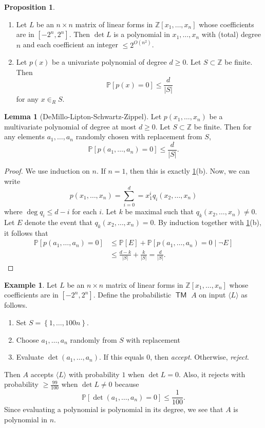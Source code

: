 \documentclass[10pt,letterpaper,cm]{nupset}
\theoremstyle{definition}
\newtheorem{exmp}[definition]{Example}
\theoremstyle{theorem}
\newtheorem{lemma}[definition]{Lemma}
\newtheorem{prop}[definition]{Proposition}
\theoremstyle{remark}
\newcommand{\Z}{\mathbb Z}
\newcommand{\1}{\mathbf{1}}
\newcommand{\0}{\vec 0}
\DeclareMathOperator{\TM}{\mathsf{TM}}
\begin{document}
\begin{prop}\label{poly} $ $
\begin{enumerate}[label=(\alph*)]
\item Let $L$ be an $n\times n$ matrix of linear forms in $\Z[x_1, \ldots, x_n]$ whose coefficients are in $\left[{-2}^n, 2^n\right]$. Then $\det{L}$ is a polynomial in $x_1, \ldots, x_n$ with (total) degree $n$ and each coefficient an integer $\leq 2^{O(n^2)}$.
\item Let $p(x)$ be a univariate polynomial of degree $d \geq 0$. Let $S\subset \Z$ be finite. Then $$\mathbb{P}\left[p(x) =0\right] \leq \frac{d}{\left\lvert{S}\right\rvert}$$ for any $x\in_R S$.
\end{enumerate}
\end{prop}

\begin{lemma}[DeMillo-Lipton-Schwartz-Zippel]\label{Dem}
Let $p(x_1, \ldots, x_n)$ be a multivariate polynomial of degree at most $d\geq 0$. Let $S \subset \Z$ be finite. Then for any elements $a_1, \ldots, a_n$ randomly chosen with replacement from $S$, $$\mathbb{P}\left[p(a_1, \ldots, a_n) =0\right] \leq \frac{d}{\left\lvert{S}\right\rvert}.$$
\end{lemma}
\begin{proof}
We use induction on $n$. If $n=1$, then this is exactly \cref{poly}(b). Now, we can write $$p(x_1, \ldots, x_n) = \sum_{i=0}^d = x_1^i q_i(x_2, \ldots, x_n)$$ where $\deg{q_i} \leq d-i$ for each $i$. Let $k$ be maximal such that $q_k(x_2, \ldots, x_n) \ne 0$. Let $E$ denote the event that $q_k(x_2, \ldots, x_n) =0$. 
By induction together with \cref{poly}(b), it follows that  
\begin{align*} \mathbb{P}\left[p(a_1, \ldots, a_n) =0\right] & \leq \mathbb{P}[E] + \mathbb{P}\left[p(a_1, \ldots, a_n) =0 \mid \neg{E}\right]
\\ & \leq \frac{d-k}{\left\lvert{S}\right\rvert} + \frac{k}{\left\lvert{S}\right\rvert} = \frac{d}{\left\lvert{S}\right\rvert}.
\end{align*}
\end{proof}

\begin{exmp}\label{matrix}
Let $L$ be an $n \times n$ matrix of linear forms in $\Z[x_1, \ldots, x_n]$ whose coefficients are in $\left[{-2}^n, 2^n\right]$. Define the probabilistic $\TM$ $A$ on input $\langle L \rangle$ as follows. 
\begin{enumerate}
\item Set $S = \left\{1, \ldots, 100n\right\}$.
\item Choose $a_1, \ldots, a_n$ randomly from $S$ with replacement
\item Evaluate $\det(a_1, \ldots, a_n)$.  If this equals $0$, then \textit{accept}. Otherwise, \textit{reject}.
\end{enumerate}
Then $A$ accepts $\langle L \rangle$ with probability $1$ when $\det{L} = 0$. Also, it rejects with probability $\geq \frac{99}{100}$ when $\det{L} \ne 0$ because $$\mathbb{P}\left[\det(a_1, \ldots, a_n) =0\right] \leq \frac{1}{100}.$$ Since evaluating a polynomial is polynomial in its degree, we see that $A$ is polynomial in $n$.
\end{exmp}
\end{document}
